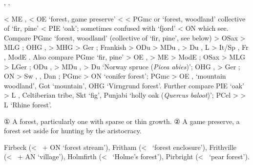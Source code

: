 \documentclass[12pt,letterpaper,oneside,article,draft]{memoir}
\begin{document}
\begin{Lemma}
\begin{Also}
	, , 
\end{Also}
\begin{Etymology}
	< ME ,  < OE  ‘forest, game preserve’ < 
		< PGmc  or  ‘forest, woodland’ collective of  ‘fir, pine’
		< PIE  ‘oak’; sometimes confused with  ‘fjord’ < ON  which see.
	Compare
	PGmc  ‘forest, woodland’ (collective of  ‘fir, pine’, see below) >
		OSax  > MLG ;
		OHG ,  > MHG  > Ger ;
		Frankish  >
			ODu  > MDu , \fm{vorst} > Du ,
			L  > It/Sp , Fr , ModE .
	Also compare
	PGmc  ‘fir, pine’ >
		OE ,  > ME  > ModE ;
		OSax  > MLG  > LGer ;
		ODu ,  > MDu ,  >
			Du  ‘Norway spruce (\textit{Picea abies})’;
		OHG ,  > Ger ;
		ON  > Sw , , Dan ;
	PGmc  > ON  ‘conifer forest’;
	PGmc  > OE ,  ‘mountain woodland’,
		Got   ‘mountain’,
		OHG  ‘Virngrund forest’.
	Further compare
	PIE  ‘oak’ > L , Celtiberian  tribe,
		Skt   ‘fig’,
		Punjabi   ‘holly oak (\textit{Quercus baloot})’;
	PCel  >  > L  ‘Rhine forest’.
\end{Etymology}
\begin{Definitions}
	① A forest, particularly one with sparse or thin growth.
	② A game preserve, a forest set aside for hunting by the aristocracy.
\end{Definitions}
\begin{Examples}
	Firbeck (<~ + ON  ‘forest stream’),
	Fritham (<~ ‘forest enclosure’),
	Frithville (<~ + AN  ‘village’),
	Holmfirth (<~ ‘Holme’s forest’),
	Pirbright (<~ ‘pear forest’).
\end{Examples}
\end{Lemma}
\end{document}
